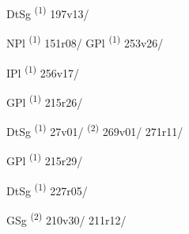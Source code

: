 \noindent{} \LEMMALINE
\begin{description}
    \item[] DtSg \textsuperscript{(1)} \mbox{197v13/}
\end{description}
\ENTRYEND

\noindent{} \LEMMALINE
\begin{description}
    \item[] NPl \textsuperscript{(1)} \mbox{151r08/} \CASEBREAK GPl \textsuperscript{(1)} \mbox{253v26/}
\end{description}
\ENTRYEND

\noindent{} \LEMMALINE
\begin{description}
    \item[] IPl \textsuperscript{(1)} \mbox{256v17/}
\end{description}
\ENTRYEND

\noindent{} \LEMMALINE
\begin{description}
    \item[] GPl \textsuperscript{(1)} \mbox{215r26/}
\end{description}
\ENTRYEND

\noindent{} \LEMMALINE
\begin{description}
    \item[] DtSg \textsuperscript{(1)} \mbox{27v01/} \textsuperscript{(2)} \mbox{269v01/} \mbox{271r11/}
\end{description}
\ENTRYEND

\noindent{} \LEMMALINE
\begin{description}
    \item[] GPl \textsuperscript{(1)} \mbox{215r29/}
\end{description}
\ENTRYEND

\noindent{} \LEMMALINE
\begin{description}
    \item[] DtSg \textsuperscript{(1)} \mbox{227r05/}
\end{description}
\ENTRYEND

\noindent{} \LEMMALINE
\begin{description}
    \item[] GSg \textsuperscript{(2)} \mbox{210v30/} \mbox{211r12/}
\end{description}
\ENTRYEND
